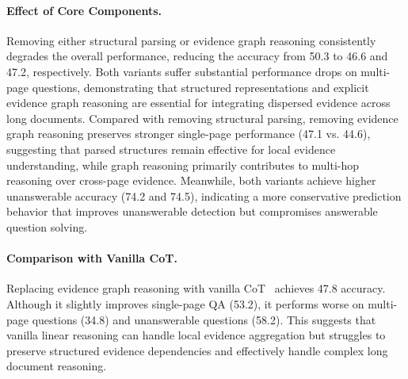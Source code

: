 \documentclass[letterpaper]{article} %
\begin{document}
\paragraph{Effect of Core Components.}
Removing either structural parsing or evidence graph reasoning consistently degrades the overall performance, reducing the accuracy from 50.3 to 46.6 and 47.2, respectively. Both variants suffer substantial performance drops on multi-page questions, demonstrating that structured representations and explicit evidence graph reasoning are essential for integrating dispersed evidence across long documents. Compared with removing structural parsing, removing evidence graph reasoning preserves stronger single-page performance (47.1 vs. 44.6), suggesting that parsed structures remain effective for local evidence understanding, while graph reasoning primarily contributes to multi-hop reasoning over cross-page evidence. Meanwhile, both variants achieve higher unanswerable accuracy (74.2 and 74.5), indicating a more conservative prediction behavior that improves unanswerable detection but compromises answerable question solving.




\paragraph{Comparison with Vanilla CoT.}
Replacing evidence graph reasoning with vanilla CoT~\cite{wei2022chain} achieves 47.8 accuracy. Although it slightly improves single-page QA (53.2), it performs worse on multi-page questions (34.8) and unanswerable questions (58.2). This suggests that vanilla linear reasoning can handle local evidence aggregation but struggles to preserve structured evidence dependencies and effectively handle complex long document reasoning.
\end{document}
